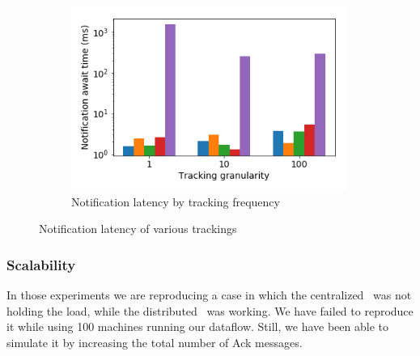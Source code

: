 \begin{figure}[t!]
\begin{subfigure}[b]{0.32\textwidth}
    \end{subfigure}
    \hspace{5mm}
    \begin{subfigure}[b]{0.32\textwidth}
            \includegraphics[width=0.99\textwidth]{pics/notification_await_time_by_tracking_frequency_bars.png}
            \caption{Notification latency by tracking frequency}
	\end{subfigure}
    \caption{Notification latency of various trackings}
\end{figure}

\subsubsection{Scalability}

In those experiments we are reproducing a case in which the centralized \tracker\ was not holding the load, while the distributed \tracker\ was working. We have failed to reproduce it while using 100 machines running our dataflow. Still, we have been able to simulate it by increasing the total number of Ack messages.

